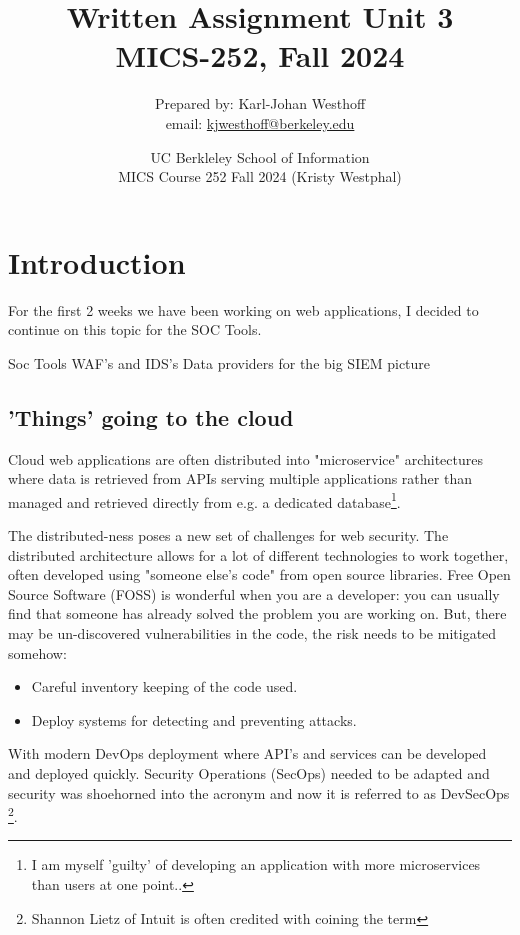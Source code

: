 \documentclass[
	letterpaper, %
	10pt, %
	unnumberedsections, %
	twoside, %
]{APAAssignment}
\title{Written Assignment Unit 3 \\ MICS-252, Fall 2024} %
\date{UC Berkleley School of Information \\
MICS Course 252 Fall 2024 (Kristy Westphal)
}
\author{
	Prepared by: Karl-Johan Westhoff \\
	email: \href{mailto:kjwesthoff@berkeley.edu}{kjwesthoff@berkeley.edu}
}
\begin{document}
\onecolumn
\maketitle %


\section{Introduction}
For the first 2 weeks we have been working on web applications, I decided to continue on this topic for the SOC Tools. 



Soc Tools
WAF's and IDS's Data providers for the big SIEM picture 

\subsection{'Things' going to the cloud}
Cloud web applications are often distributed into "microservice" architectures where data is retrieved from APIs serving multiple applications rather than managed and retrieved directly from e.g. a dedicated database\footnote{I am myself 'guilty' of developing an application with more microservices than users at one point..}. 

The distributed-ness poses a new set of challenges for web security. The distributed architecture allows for a lot of different technologies to work together, often developed using "someone else's code" from open source libraries. Free Open Source Software (FOSS) is wonderful when you are a developer: you can usually find that someone has already solved the problem you are working on. But, there may be un-discovered vulnerabilities in the code, the risk needs to be mitigated somehow:

\begin{itemize}
	\item Careful inventory keeping of the code used. 
	\item Deploy systems for detecting and preventing attacks.
\end{itemize}

With modern DevOps deployment where API's and services can be developed and deployed quickly. Security Operations (SecOps) needed to be adapted and security was shoehorned into the acronym and now it is referred to as DevSecOps \footnote{Shannon Lietz of Intuit is often credited with coining the term\cite{DevSecOps}}. 
\end{document}
